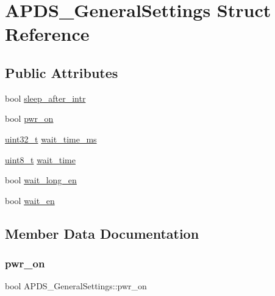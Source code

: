 \hypertarget{structAPDS__GeneralSettings}{}\section{A\+P\+D\+S\+\_\+\+General\+Settings Struct Reference}
\label{structAPDS__GeneralSettings}
\subsection*{Public Attributes}
\begin{DoxyCompactItemize}
\item 
bool \hyperlink{structAPDS__GeneralSettings_ad2a30d2b8de189e172590761d17faf4c}{sleep\+\_\+after\+\_\+intr}
\item 
bool \hyperlink{structAPDS__GeneralSettings_a9ea5752f59abeea31c54a59621f1e8e7}{pwr\+\_\+on}
\item 
\hyperlink{vl53l0x__types_8h_a435d1572bf3f880d55459d9805097f62}{uint32\+\_\+t} \hyperlink{structAPDS__GeneralSettings_a01d37b5bd42dab254fd9701492784a03}{wait\+\_\+time\+\_\+ms}
\item 
\hyperlink{vl53l0x__types_8h_aba7bc1797add20fe3efdf37ced1182c5}{uint8\+\_\+t} \hyperlink{structAPDS__GeneralSettings_ac782ac2109c3302dcdb35d26ad2ce664}{wait\+\_\+time}
\item 
bool \hyperlink{structAPDS__GeneralSettings_ad5bb9912a9cb4653257113d164b56b54}{wait\+\_\+long\+\_\+en}
\item 
bool \hyperlink{structAPDS__GeneralSettings_ab298e8bcba856af83c12c0a356341ecf}{wait\+\_\+en}
\end{DoxyCompactItemize}


\subsection{Member Data Documentation}
\mbox{\label{structAPDS__GeneralSettings_a9ea5752f59abeea31c54a59621f1e8e7}} 
\subsubsection{\texorpdfstring{pwr\+\_\+on}{pwr\_on}}
{\footnotesize\ttfamily bool A\+P\+D\+S\+\_\+\+General\+Settings\+::pwr\+\_\+on}

